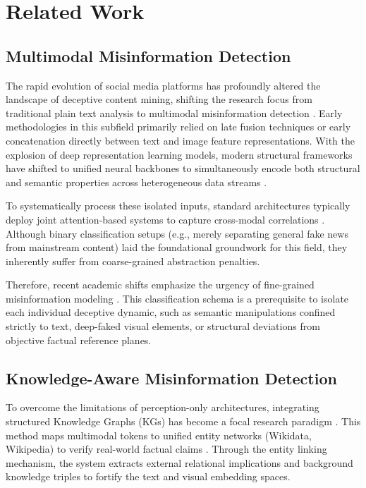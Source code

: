 \section{Related Work}

\subsection{Multimodal Misinformation Detection}
The rapid evolution of social media platforms has profoundly altered the landscape of deceptive content mining, shifting the research focus from traditional plain text analysis to multimodal misinformation detection \cite{ref11}. Early methodologies in this subfield primarily relied on late fusion techniques or early concatenation directly between text and image feature representations. With the explosion of deep representation learning models, modern structural frameworks have shifted to unified neural backbones to simultaneously encode both structural and semantic properties across heterogeneous data streams \cite{ref12, ref8}.

To systematically process these isolated inputs, standard architectures typically deploy joint attention-based systems to capture cross-modal correlations \cite{ref13}. Although binary classification setups (e.g., merely separating general fake news from mainstream content) laid the foundational groundwork for this field, they inherently suffer from coarse-grained abstraction penalties.

Therefore, recent academic shifts emphasize the urgency of fine-grained misinformation modeling \cite{ref14}. This classification schema is a prerequisite to isolate each individual deceptive dynamic, such as semantic manipulations confined strictly to text, deep-faked visual elements, or structural deviations from objective factual reference planes.

\subsection{Knowledge-Aware Misinformation Detection}
To overcome the limitations of perception-only architectures, integrating structured Knowledge Graphs (KGs) has become a focal research paradigm \cite{ref15, ref16, ref17}. This method maps multimodal tokens to unified entity networks (Wikidata, Wikipedia) to verify real-world factual claims \cite{ref18}. Through the entity linking mechanism, the system extracts external relational implications and background knowledge triples to fortify the text and visual embedding spaces.

